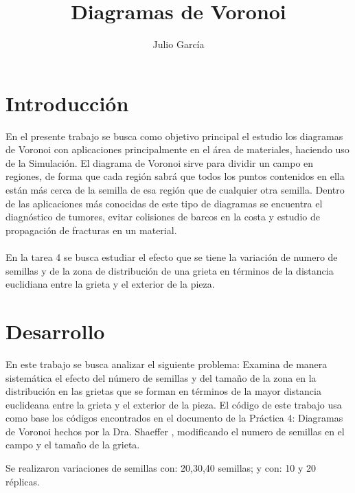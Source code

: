 \documentclass{article}
\title {Diagramas de Voronoi}
\author{Julio Garc\'ia}
\begin{document}
	\renewcommand{\listtablename}{Índice de tablas}
	\renewcommand{\tablename}{Cuadro}
\maketitle
	
\section{Introducción}
En el presente trabajo se busca como objetivo principal el estudio los diagramas de Voronoi con aplicaciones principalmente en el área de materiales, haciendo uso de la Simulación. El diagrama de Voronoi sirve para dividir un campo en regiones, de forma que cada región sabrá que todos los puntos contenidos en ella están más cerca de la semilla de esa región que de cualquier otra semilla. Dentro de las aplicaciones más conocidas de este tipo de diagramas se encuentra el diagnóstico de tumores, evitar colisiones de barcos en la costa y estudio de propagación de fracturas en un material.\\
\\
En la tarea 4 se busca estudiar el efecto que se tiene la variación de numero de semillas y de la zona de distribución de una grieta en términos de la distancia euclidiana entre la grieta y el exterior de la pieza.

\section{Desarrollo}
En este trabajo se busca analizar el siguiente problema: Examina de manera sistemática el efecto del número de semillas y del tamaño de la zona en la distribución en las grietas que se forman en términos de la mayor distancia euclideana entre la grieta y el exterior de la pieza. 
El código de este trabajo usa como base los códigos encontrados en el documento de la Práctica 4: Diagramas de Voronoi hechos por la Dra. Shaeffer \cite{p4}, modificando el numero de semillas en el campo y el tamaño de la grieta. 

Se realizaron variaciones de semillas con:  20,30,40 semillas; y con: 10 y 20 réplicas.
\end{document}
